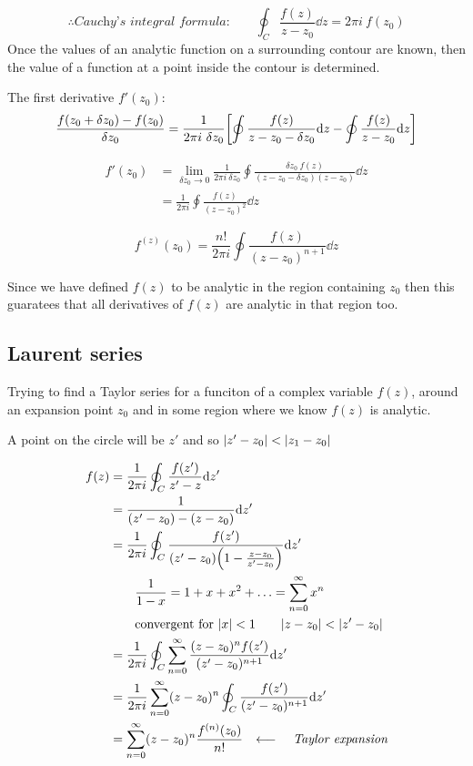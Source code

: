 \documentclass[10pt, a4paper, twocolumn]{article}
\newcommand{\larr}{\ensuremath{\longleftarrow\ }}
\begin{document}
\[\therefore
\textit{Cauchy's integral formula:}\qquad
\oint_C\frac{f(z)}{z-z_0}\dd z=2\pi i\ f(z_0)
\]
Once the values of an analytic function on a surrounding contour are known, then the value of a function at a point inside the contour is determined.

The first derivative $f'(z_0)$:
\[\frac{f(z_0+\delta z_0)-f(z_0)}{\delta z_0}
=\frac{1}{2\pi i\ \delta z_0}
\bqty{\oint\frac{f(z)}{z-z_0-\delta z_0}\dd z
-\oint\frac{f(z)}{z-z_0}\dd z} \]

\begin{equation*}
\begin{aligned}
f'(z_0)&=\lim_{\delta z_0\to 0}
\frac{1}{2\pi i\ \delta z_0}
\oint\frac{\delta z_0\ f(z)}
{(z-z_0-\delta z_0)(z-z_0)}\dd z
\\&=\frac{1}{2\pi i}
\oint\frac{f(z)}{(z-z_0)^2}\dd z
\end{aligned}
\end{equation*}

\[f^{(z)}(z_0)=\frac{n!}{2\pi i}
\oint\frac{f(z)}{(z-z_0)^{n+1}}\dd z\]

Since we have defined $f(z)$ to be analytic in the region containing $z_0$ then this guaratees that all derivatives of $f(z)$ are analytic in that region too.

\subsection{Laurent series}

Trying to find a Taylor series for a funciton of a complex variable $f(z)$, around an expansion point $z_0$ and in some region where we know $f(z)$ is analytic.

A point on the circle will be $z'$ and so
$\abs{z'-z_0}<\abs{z_1-z_0} $

\begin{equation*}
\begin{aligned}
f(z)&=\frac{1}{2\pi i}
\oint_C\frac{f(z')}{z'-z}\dd z'
\\&=\frac{1}{(z'-z_0)-(z-z_0)}\dd z'
\\&=\frac{1}{2\pi i} \oint_C
\frac{f(z')}{(z'-z_0)
\pqty{1-\frac{z-z_0}{z'-z_0}}}\dd z'
\\&\qquad
\frac{1}{1-x}=1+x+x^2+\ldots=\sum_{n=0}^\infty x^n
\\&\qquad \text{convergent for $\abs{x}<1$}
\qquad\abs{z-z_0}<\abs{z'-z_0}
\\&=\frac{1}{2\pi i}
\oint_C\sum_{n=0}^\infty
\frac{(z-z_0)^nf(z')}
{(z'-z_0)^{n+1}}\dd z'
\\&=\frac{1}{2\pi i}\sum_{n=0}^\infty
(z-z_0)^n
\oint_C\frac{f(z')}{(z'-z_0)^{n+1}}\dd z'
\\&=\sum_{n=0}^\infty(z-z_0)^n
\frac{f^{(n)}(z_0)}{n!}
\qq{\larr}\textit{Taylor expansion}
\end{aligned}
\end{equation*}
\end{document}
